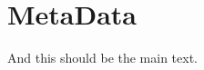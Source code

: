 
\def\mytitle{This should be a $<$title$>$ element}
\def\myauthor{This should be the author}

\def\bibliocommand{}
\def\mydate{January 1, 2011}
\def\emptymetadata{}

\part{MetaData}
\label{metadata}

And this should be the main text.




